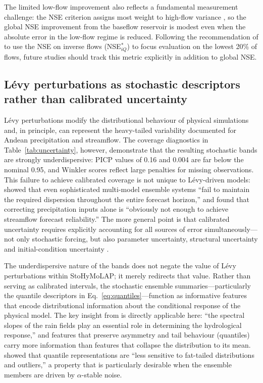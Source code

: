 \documentclass[a4paper,fleqn]{cas-sc}
\begin{document}
The limited low-flow improvement also reflects a fundamental
measurement challenge: the NSE criterion assigns most weight to
high-flow variance \citep{pushpalatha2012}, so the global NSE
improvement from the baseflow reservoir is modest even when the
absolute error in the low-flow regime is reduced. Following the
recommendation of \citet{pushpalatha2012} to use the NSE on inverse
flows (NSE$^*_{iQ}$) to focus evaluation on the lowest 20\% of
flows, future studies should track this metric explicitly in addition
to global NSE.

\subsection{L\'{e}vy perturbations as stochastic descriptors rather
than calibrated uncertainty}\label{subsec:discussion-levy}

L\'{e}vy perturbations modify the distributional behaviour of physical
simulations and, in principle, can represent the heavy-tailed
variability documented for Andean precipitation and streamflow. The
coverage diagnostics in Table~\ref{tab:uncertainty}, however,
demonstrate that the resulting stochastic bands are strongly
underdispersive: PICP values of 0.16 and 0.004 are far below the
nominal 0.95, and Winkler scores reflect large penalties for missing
observations. This failure to achieve calibrated coverage is not
unique to L\'{e}vy-driven models: \citet{thiboult2016} showed that
even sophisticated multi-model ensemble systems ``fail to maintain
the required dispersion throughout the entire forecast horizon,'' and
\citet{crochemore2016} found that correcting precipitation inputs
alone is ``obviously not enough to achieve streamflow forecast
reliability.'' The more general point is that calibrated uncertainty
requires explicitly accounting for all sources of error
simultaneously---not only stochastic forcing, but also parameter
uncertainty, structural uncertainty and initial-condition uncertainty
\citep{demirel2013,thiboult2016}.

The underdispersive nature of the bands does not negate the value of
L\'{e}vy perturbations within StoHyMoLAP; it merely redirects that
value. Rather than serving as calibrated intervals, the stochastic
ensemble summaries---particularly the quantile descriptors in
Eq.~\ref{eq:quantiles}---function as informative features that encode
distributional information about the conditional response of the
physical model. The key insight from \citet{gabellani2007} is directly
applicable here: ``the spectral slopes of the rain fields play an
essential role in determining the hydrological response,'' and features
that preserve asymmetry and tail behaviour (quantiles) carry more
information than features that collapse the distribution to its mean.
\citet{swiderski2016} showed that quantile representations are
``less sensitive to fat-tailed distributions and outliers,'' a
property that is particularly desirable when the ensemble members are
driven by $\alpha$-stable noise.
\end{document}
